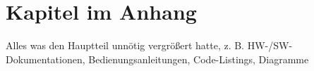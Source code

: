 \chapter{Kapitel im Anhang}
\label{sec:a-kapitel}

Alles was den Hauptteil unnötig vergrößert hatte, z. B. HW-/SW-Dokumentationen, Bedienungsanleitungen, Code-Listings, Diagramme
